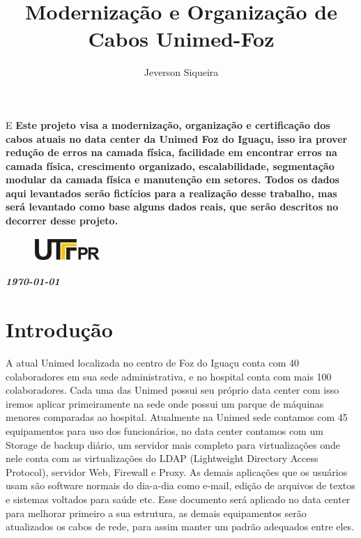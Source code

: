 \documentclass[	DIV=calc,%
							paper=a4,%
							fontsize=12pt,%
							onecolumn]{scrartcl}	 					%
\title{Modernização e Organização de Cabos Unimed-Foz}					%
\author{Jeverson Siqueira}  	%
\date{}																				%
\newcommand{\initial}[1]{%
     \lettrine[lines=3,lhang=0.3,nindent=0em]{
     				\color{DarkGoldenrod}
     				{\textsf{#1}}}{}}
\begin{document}
\maketitle
\thispagestyle{fancy} 	
\thispagestyle{empty}		%




\initial{E}\textbf{
	Este projeto visa a modernização, organização e certificação dos cabos atuais no data center da Unimed Foz do Iguaçu, isso ira prover redução de erros na camada física, facilidade em encontrar erros na camada física, crescimento organizado, escalabilidade, segmentação modular da camada física e manutenção em setores. Todos os dados aqui levantados serão fictícios para a realização desse trabalho, mas será levantado como base alguns dados reais, que serão descritos no decorrer desse projeto. 
}

\begin{figure}
	\centering
	\includegraphics{utfpr}
\end{figure}

\vspace{3cm}
\centerline{\textit{\textbf{\today}}}





\clearpage
\renewcommand{\contentsname}{Sumário}
\tableofcontents
\clearpage

\section{Introdução}

A atual Unimed localizada no centro de Foz do Iguaçu conta com 40 colaboradores em sua sede administrativa, e no hospital conta com mais 100 colaboradores. Cada uma das Unimed possui seu próprio data center com isso iremos aplicar primeiramente na sede onde possui um parque de máquinas menores comparadas ao hospital. Atualmente na Unimed sede contamos com 45 equipamentos para uso dos funcionários, no data center contamos com um Storage de backup diário, um servidor mais completo para virtualizações onde nele conta com as virtualizações do LDAP (Lightweight Directory Access Protocol), servidor Web, Firewall e Proxy. As demais aplicações que os usuários usam são software normais do dia-a-dia como e-mail, edição de arquivos de textos e sistemas voltados para saúde etc. Esse documento será aplicado no data center para melhorar primeiro a sua estrutura, as demais equipamentos serão atualizados os cabos de rede, para assim manter um padrão adequados entre eles.
\end{document}
